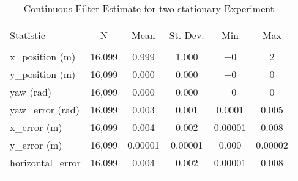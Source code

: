 
\begin{table}[h] \centering 
  \caption{Continuous Filter Estimate for two-stationary Experiment} 
  \label{tab:two_stationary_continuous_summary} 
\begin{tabular}{@{\extracolsep{5pt}}lccccc} 
\\[-1.8ex]\hline 
\hline \\[-1.8ex] 
Statistic & \multicolumn{1}{c}{N} & \multicolumn{1}{c}{Mean} & \multicolumn{1}{c}{St. Dev.} & \multicolumn{1}{c}{Min} & \multicolumn{1}{c}{Max} \\ 
\hline \\[-1.8ex] 
x\_position (m) & 16,099 & \num{0.999} & \num{1.000} & $-$0 & 2 \\ 
y\_position (m) & 16,099 & \num{0.000} & \num{0.000} & $-$0 & 0 \\ 
yaw (rad) & 16,099 & \num{0.000} & \num{0.000} & $-$0 & 0 \\ 
yaw\_error (rad) & 16,099 & \num{0.003} & \num{0.001} & \num{0.0001} & \num{0.005} \\ 
x\_error (m) & 16,099 & \num{0.004} & \num{0.002} & \num{0.00001} & \num{0.008} \\ 
y\_error (m) & 16,099 & \num{0.00001} & \num{0.00001} & \num{0.000} & \num{0.00002} \\ 
horizontal\_error & 16,099 & \num{0.004} & \num{0.002} & \num{0.00001} & \num{0.008} \\ 
\hline \\[-1.8ex] 
\end{tabular} 
\end{table} 
